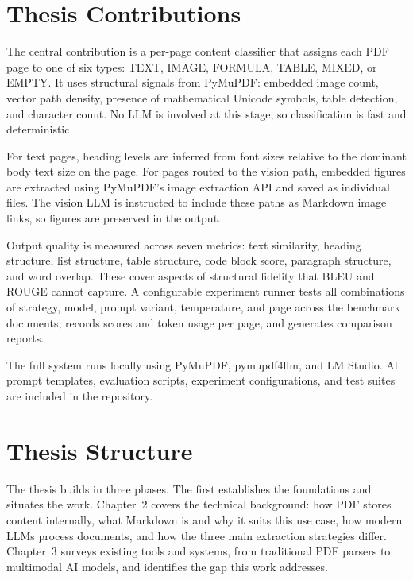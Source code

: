 \section{Thesis Contributions}

The central contribution is a per-page content classifier that assigns each
PDF page to one of six types: TEXT, IMAGE, FORMULA, TABLE, MIXED, or EMPTY.
It uses structural signals from PyMuPDF: embedded image count, vector path
density, presence of mathematical Unicode symbols, table detection, and
character count. No LLM is involved at this stage, so classification is fast
and deterministic.

For text pages, heading levels are inferred from font sizes relative to the
dominant body text size on the page. For pages routed to the vision path,
embedded figures are extracted using PyMuPDF's image extraction API and
saved as individual files. The vision LLM is instructed to include these paths
as Markdown image links, so figures are preserved in the output.

Output quality is measured across seven metrics: text similarity, heading
structure, list structure, table structure, code block score, paragraph
structure, and word overlap. These cover aspects of structural fidelity that
BLEU and ROUGE cannot capture. A configurable experiment runner tests all
combinations of strategy, model, prompt variant, temperature, and page across
the benchmark documents, records scores and token usage per page, and generates
comparison reports.

The full system runs locally using PyMuPDF, pymupdf4llm, and LM Studio. All
prompt templates, evaluation scripts, experiment configurations, and test
suites are included in the repository.

\section{Thesis Structure}

The thesis builds in three phases. The first establishes the foundations and
situates the work. Chapter~2 covers the technical background: how PDF stores
content internally, what Markdown is and why it suits this use case, how
modern LLMs process documents, and how the three main extraction strategies
differ. Chapter~3 surveys existing tools and systems, from traditional PDF
parsers to multimodal AI models, and identifies the gap this work addresses.

